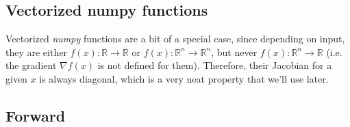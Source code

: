 \documentclass[paper=a4,11pt,headsepline]{scrartcl}
\newcommand{\ve}[1]{\ensuremath{\bm{\mathit{#1}}}}
\newcommand{\ra}{\ensuremath{\rightarrow}}
\begin{document}
\subsection{Vectorized numpy functions}

Vectorized \textsl{numpy} functions are a bit of a special case, since
depending on input, they are either $f(x):\mathbb R\ra\mathbb R$ or $\ve f(\ve
x):\mathbb R^n\ra\mathbb R^n$, but never $f(\ve x): \mathbb R^n \ra \mathbb R$
(i.e. the gradient $\nabla f(\ve x)$ is not defined for them). Therefore, their
Jacobian for a given \ve x is always diagonal, which is a very neat property
that we'll use later.

\subsection{Forward}
\end{document}
